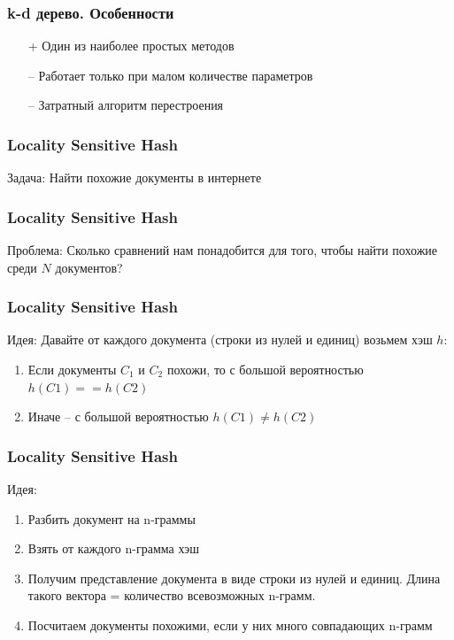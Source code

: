 \documentclass[10pt]{beamer}
\begin{document}
\begin{frame}\frametitle{k-d дерево. Особенности}
	\begin{itemize} [<+- | alert@ +>]
	\item[+] Один из наиболее простых методов
	\item[--] Работает только при малом количестве параметров
	\item[--] Затратный алгоритм перестроения
	\end{itemize}
\end{frame}

\begin{frame}\frametitle{Locality Sensitive Hash}
  \alert{Задача}: Найти похожие документы в интернете\\
\end{frame}

\begin{frame}\frametitle{Locality Sensitive Hash}
	\alert{Проблема}: Сколько сравнений нам понадобится  для того, чтобы найти похожие среди $N$ документов?\\
	\bigbreak
	\uncover<2>{
	$C = \frac{N(N-1)}{2}$\\
	\bigbreak
	$N = 10^6 \Rightarrow C = 5*10^{11}$
	}
\end{frame}

\begin{frame}\frametitle{Locality Sensitive Hash}
	\alert{Идея}: Давайте от каждого документа (строки из нулей и единиц) возьмем хэш $h$:\\
	\begin{enumerate} [<+->]
	\item Если документы $C_1$ и $C_2$ похожи, то с большой вероятностью $h(C1) == h(C2)$\\
	\item Иначе -- с большой вероятностью $h(C1) \neq h(C2)$
	\end{enumerate}
\end{frame}

\begin{frame}\frametitle{Locality Sensitive Hash}
	\alert{Идея}: \\
	\begin{enumerate}
	\item Разбить документ на n-граммы
	\item Взять от каждого n-грамма хэш
	\item Получим представление документа в виде строки из нулей и единиц. Длина такого вектора = количество всевозможных n-грамм.
	\item Посчитаем документы похожими, если у них много совпадающих n-грамм
	\end{enumerate}
\end{frame}
\end{document}
